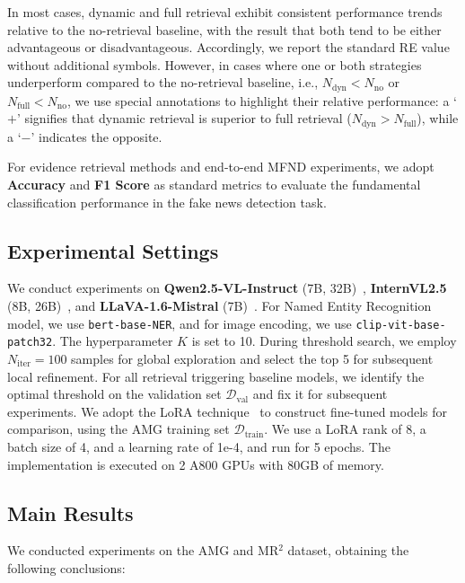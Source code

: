 In most cases, dynamic and full retrieval exhibit consistent performance trends relative to the no-retrieval baseline, with the result that both tend to be either advantageous or disadvantageous. Accordingly, we report the standard RE value without additional symbols. However, in cases where one or both strategies underperform compared to the no-retrieval baseline, i.e., $N_{\text{dyn}} < N_{\text{no}}$ or $N_{\text{full}} < N_{\text{no}}$, we use special annotations to highlight their relative performance: a `$+$' signifies that dynamic retrieval is superior to full retrieval ($N_{\text{dyn}} > N_{\text{full}}$), while a `$-$' indicates the opposite.

For evidence retrieval methods and end-to-end MFND experiments, we adopt \textbf{Accuracy} and \textbf{F1 Score} as standard metrics to evaluate the fundamental classification performance in the fake news detection task.

\subsection{Experimental Settings}
We conduct experiments on \textbf{Qwen2.5-VL-Instruct} (7B, 32B)~\cite{bai2025qwen2}, \textbf{InternVL2.5} (8B, 26B)~\cite{chen2024expanding}, and \textbf{LLaVA-1.6-Mistral} (7B)~\cite{liu2024llavanext}. For Named Entity Recognition model, we use \texttt{bert-base-NER}, and for image encoding, we use \texttt{clip-vit-base-patch32}. The hyperparameter $K$ is set to 10. During threshold search, we employ $N_{\text{iter}} = 100$ samples for global exploration and select the top 5 for subsequent local refinement.
 For all retrieval triggering baseline models, we identify the optimal threshold on the validation set $\mathcal{D}_{\text{val}}$ and fix it for subsequent experiments. We adopt the LoRA technique~\cite{hu2022lora} to construct fine-tuned models for comparison, using the AMG training set $\mathcal{D}_{\text{train}}$. We use a LoRA rank of 8, a batch size of 4, and a learning rate of 1e-4, and run for 5 epochs. The implementation is executed on 2 A800 GPUs with 80GB of memory.

\subsection{Main Results}



We conducted experiments on the AMG and MR$^2$ dataset,  obtaining the following conclusions:

